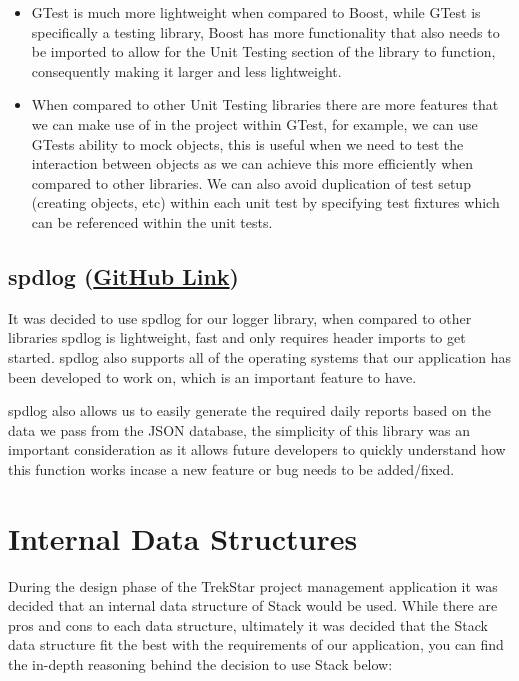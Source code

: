 \documentclass[
  english,
  a4paper,
,tablecaptionabove
]{scrartcl}
\providecommand{\tightlist}{%
  \setlength{\itemsep}{0pt}\setlength{\parskip}{0pt}}
\begin{document}
\begin{itemize}
\tightlist
\item
  GTest is much more lightweight when compared to Boost, while GTest is
  specifically a testing library, Boost has more functionality that also
  needs to be imported to allow for the Unit Testing section of the
  library to function, consequently making it larger and less
  lightweight.
\item
  When compared to other Unit Testing libraries there are more features
  that we can make use of in the project within GTest, for example, we
  can use GTests ability to mock objects, this is useful when we need to
  test the interaction between objects as we can achieve this more
  efficiently when compared to other libraries. We can also avoid
  duplication of test setup (creating objects, etc) within each unit
  test by specifying test fixtures which can be referenced within the
  unit tests.
\end{itemize}

\hypertarget{spdlog-github-link}{%
\subsection{\texorpdfstring{spdlog
(\href{https://github.com/gabime/spdlog}{GitHub
Link})}{spdlog (GitHub Link)}}\label{spdlog-github-link}}

It was decided to use spdlog for our logger library, when compared to
other libraries spdlog is lightweight, fast and only requires header
imports to get started. spdlog also supports all of the operating
systems that our application has been developed to work on, which is an
important feature to have.

spdlog also allows us to easily generate the required daily reports
based on the data we pass from the JSON database, the simplicity of this
library was an important consideration as it allows future developers to
quickly understand how this function works incase a new feature or bug
needs to be added/fixed.

\newpage

\hypertarget{internal-data-structures}{%
\section{Internal Data Structures}\label{internal-data-structures}}

During the design phase of the TrekStar project management application
it was decided that an internal data structure of Stack would be used.
While there are pros and cons to each data structure, ultimately it was
decided that the Stack data structure fit the best with the requirements
of our application, you can find the in-depth reasoning behind the
decision to use Stack below:
\end{document}
